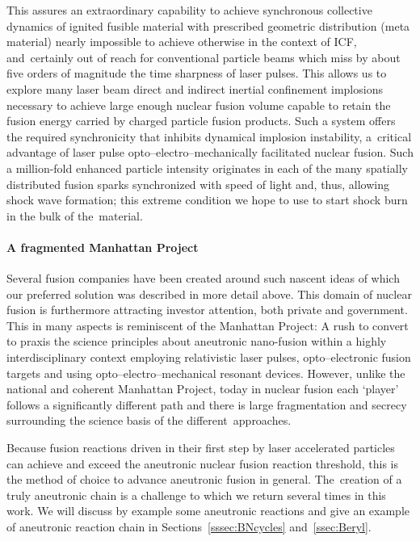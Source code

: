 \documentclass[particles,article,accept,pdftex,moreauthors]{Definitions/mdpi}
\begin{document}
This assures an extraordinary capability to achieve synchronous collective dynamics of ignited fusible material with prescribed geometric distribution (meta material) nearly impossible to achieve otherwise in the context of ICF, and~certainly out of reach for conventional particle beams which miss by about five orders of magnitude the time sharpness of laser pulses. This allows us to explore many laser beam direct and indirect inertial confinement implosions necessary to achieve large enough nuclear fusion volume capable to retain the fusion energy carried by charged particle fusion products. Such a system offers the required synchronicity that inhibits dynamical implosion instability, a~critical advantage of laser pulse opto--electro--mechanically facilitated nuclear fusion. Such a million-fold enhanced particle intensity originates in each of the many spatially distributed fusion sparks synchronized with speed of light and, thus, allowing shock wave formation; this extreme condition we hope to use to start shock burn in the bulk of the~material.

\vspace{-6pt}\paragraph*{\bf A fragmented Manhattan Project}
Several fusion companies have been created around such nascent ideas of which our preferred solution was described in more detail above. This domain of nuclear fusion is furthermore attracting investor attention, both private and government. This in many aspects is reminiscent of the Manhattan Project: A rush to convert to praxis the science principles about aneutronic nano-fusion within a highly interdisciplinary context employing relativistic laser pulses, opto--electronic fusion targets and using opto--electro--mechanical resonant devices. However, unlike the national and coherent Manhattan Project, today in nuclear fusion each `player' follows a significantly different path and there is large fragmentation and secrecy surrounding the science basis of the different~approaches.

Because fusion reactions driven in their first step by laser accelerated particles can achieve and exceed the aneutronic nuclear fusion reaction threshold, this is the method of choice to advance aneutronic fusion in general. The~creation of a truly aneutronic chain is a challenge to which we return several times in this work. We will discuss by example some aneutronic reactions and give an example of aneutronic reaction chain in Sections~\ref{sssec:BNcycles} and~\ref{ssec:Beryl}.
 
\end{document}
